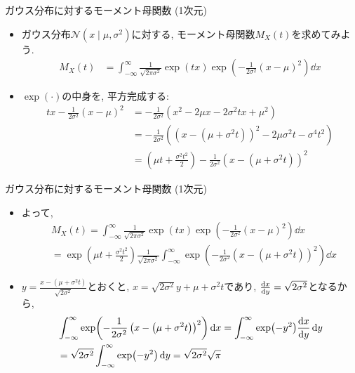 \documentclass[dvipdfmx,notheorems,t]{beamer}
\begin{document}
\begin{frame}{ガウス分布に対するモーメント母関数 (1次元)}
\begin{itemize}
  \item ガウス分布$\mathcal{N}(x \mid \mu, \sigma^2)$に対する, モーメント母関数$M_X(t)$を求めてみよう.
  \begin{align*}
    M_X(t) &= \int_{-\infty}^\infty \frac{1}{\sqrt{2\pi \sigma^2}} \exp(tx)
      \exp(-\frac{1}{2 \sigma^2} \left( x - \mu \right)^2) \dd{x}
  \end{align*}
  \item $\exp(\cdot)$の中身を, 平方完成する:
  \begin{align*}
    tx - \frac{1}{2 \sigma^2} \left( x - \mu \right)^2
    &= -\frac{1}{2 \sigma^2} \left( x^2 - 2 \mu x - 2 \sigma^2 tx + \mu^2 \right) \\
    &= -\frac{1}{2 \sigma^2} \left( \left( x - \left( \mu + \sigma^2 t \right) \right)^2
      - 2 \mu \sigma^2 t - \sigma^4 t^2 \right) \\
    &= \left( \mu t + \frac{\sigma^2 t^2}{2} \right)
      -\frac{1}{2 \sigma^2} \left( x - \left( \mu + \sigma^2 t \right) \right)^2
  \end{align*}
\end{itemize}
\end{frame}

\begin{frame}{ガウス分布に対するモーメント母関数 (1次元)}
\begin{itemize}
  \item よって,
  \begin{align*}
    & M_X(t) = \int_{-\infty}^\infty \frac{1}{\sqrt{2\pi \sigma^2}} \exp(tx)
      \exp(-\frac{1}{2 \sigma^2} \left( x - \mu \right)^2) \dd{x} \\
      &= \exp(\mu t + \frac{\sigma^2 t^2}{2}) \frac{1}{\sqrt{2\pi \sigma^2}}
        \int_{-\infty}^\infty \exp(-\frac{1}{2 \sigma^2}
        \left( x - \left( \mu + \sigma^2 t \right) \right)^2) \dd{x}
  \end{align*}
  \item $y = \frac{x - \left( \mu + \sigma^2 t \right)}{\sqrt{2 \sigma^2}}$とおくと,
  $x = \sqrt{2 \sigma^2} y + \mu + \sigma^2 t$であり,
  $\dv{x}{y} = \sqrt{2 \sigma^2}$となるから,
  \begin{align*}
    & \int_{-\infty}^\infty \exp(-\frac{1}{2 \sigma^2}
      \left( x - \left( \mu + \sigma^2 t \right) \right)^2) \dd{x}
    = \int_{-\infty}^\infty \exp(-y^2) \dv{x}{y} \dd{y} \\
    &= \sqrt{2 \sigma^2} \int_{-\infty}^\infty \exp(-y^2) \dd{y}
    = \sqrt{2 \sigma^2} \sqrt{\pi}
  \end{align*}
\end{itemize}
\end{frame}
\end{document}
